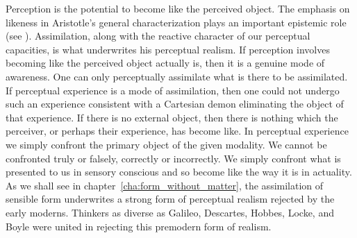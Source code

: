 Perception is the potential to become like the perceived object. The emphasis on likeness in Aristotle's general characterization plays an important epistemic role (see \citealt[58]{Burnyeat:2002an}). Assimilation, along with the reactive character of our perceptual capacities, is what underwrites his perceptual realism. If perception involves becoming like the perceived object actually is, then it is a genuine mode of awareness. One can only perceptually assimilate what is there to be assimilated. If perceptual experience is a mode of assimilation, then one could not undergo such an experience consistent with a Cartesian demon eliminating the object of that experience. If there is no external object, then there is nothing which the perceiver, or perhaps their experience, has become like. In perceptual experience we simply confront the primary object of the given modality. We cannot be confronted truly or falsely, correctly or incorrectly. We simply confront what is presented to us in sensory conscious and so become like the way it is in actuality. As we shall see in chapter~\ref{cha:form_without_matter}, the assimilation of sensible form underwrites a strong form of perceptual realism rejected by the early moderns. Thinkers as diverse as Galileo, Descartes, Hobbes, Locke, and Boyle were united in rejecting this premodern form of realism.


